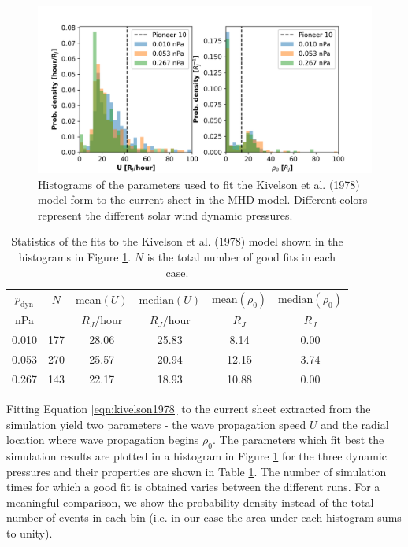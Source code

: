 \begin{figure}
    \centering
    \includegraphics[width=\textwidth]{images6/comparison_highdynP_kivelson.png}
    \caption{Histograms of the parameters used to fit the Kivelson et al. (1978) model form to the current sheet in the MHD model. Different colors represent the different solar wind dynamic pressures.}
    \label{fig:comparison-hist-kivelson}
\end{figure}

\begin{table}
    \centering
    \begin{tabular}{c|c|c|c|c|c}
     $p_\text{dyn}$&      $N$&     mean$(U)$ &   $\text{median}(U)$ &  mean$(\rho_0)$ &   $\text{median}(\rho_0)$\\
     nPa&  &  $R_J/$hour& $R_J/$hour& $R_J$& $R_J$\\
    \hline
     0.010 &  177 &  28.06 &  25.83 &   8.14 &     0.00 \\
     0.053 &  270 &  25.57 &  20.94 &  12.15 &     3.74\\
     0.267 &  143 &  22.17 &  18.93 &  10.88 &     0.00 \\

    \end{tabular}
    \caption{Statistics of the fits to the Kivelson et al. (1978) model shown in the histograms in Figure \protect\ref{fig:comparison-hist-kivelson}. $N$ is the total number of good fits in each case.}
    \label{tab:comparison-kivelson}
\end{table}


Fitting Equation \ref{eqn:kivelson1978} to the current sheet extracted from the simulation yield two parameters - the wave propagation speed $U$ and the radial location where wave propagation begins $\rho_0$. The parameters which fit best the simulation results are plotted in a histogram in Figure 
\ref{fig:comparison-hist-kivelson} for the three dynamic pressures and their properties are shown in Table \ref{tab:comparison-kivelson}. The number of simulation times for which a good fit is obtained varies between the different runs. For a meaningful comparison, we show the probability density instead of the total number of events in each bin (i.e. in our case the area under each histogram sums to unity). 


